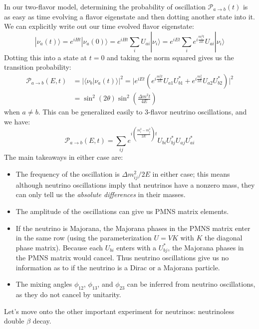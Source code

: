 \documentclass[11pt, oneside]{article}   	%
\theoremstyle{definition}
\numberwithin{equation}{subsection}		%
\begin{document}
In our two-flavor model, determining the probability of oscillation $\mathcal P_{a\rightarrow b}(t)$ is as easy as time evolving a flavor eigenstate and then 
dotting another state into it. We can explicitly write out our time evolved flavor eigenstate:
\begin{equation}
	|\nu_a(t)\rangle = e^{iHt} |\nu_a(0)\rangle = e^{i H t} \sum_i U_{a i}|\nu_i\rangle = e^{i Et} \sum_i e^{i\frac{m_i^2 t}{2 E}} U_{a i} |\nu_i\rangle
\end{equation}
Dotting this into a state at $t = 0$ and taking the norm squared gives us the transition probability:
\begin{align}
	\mathcal P_{a\rightarrow b}(E, t) &= |\langle \nu_b | \nu_a(t)\rangle |^2 = \bigg| e^{iEt} \left(e^{i \frac{m_1^2 t}{2 E}} U_{a1} U_{b1}^* + e^{i\frac{m_2^2}{2 E}} 
	U_{a2} U_{b2}^* \right)\bigg|^2 \\
	&= \sin^2(2\theta) \sin^2\left( \frac{\Delta m^2 t}{4 E} \right)
\end{align}
when $a\neq b$. This can be generalized easily to 3-flavor neutrino oscillations, and we have:
\begin{equation}
	\mathcal P_{a\rightarrow b}(E, t) = \sum_{ij} e^{i \left(\frac{m_i^2 - m_j^2}{2E}\right) t} U_{bi} U_{bj}^* U_{aj} U_{ai}^*
\end{equation}
The main takeaways in either case are:
\begin{itemize}
	\item The frequency of the oscillation is $\Delta m_{ij}^2 / 2E$ in either case; this means although neutrino oscillations imply that neutrinos have a nonzero 
	mass, they can only tell us the \textit{absolute differences} in their masses.
	\item The amplitude of the oscillations can give us PMNS matrix elements.
	\item If the neutrino is Majorana, the Majorana phases in the PMNS matrix enter in the same row (using the parameterization $U = VK$ with $K$ the diagonal 
	phase matrix). Because each $U_{bi}$ enters with a $U_{bj}^*$, the Majorana phases in the PMNS matrix would cancel. Thus neutrino oscillations 
	give us no information as to if the neutrino is a Dirac or a Majorana particle. 
	\item The mixing angles $\phi_{12}$, $\phi_{13}$, and $\phi_{23}$ can be inferred from neutrino oscillations, as they do not cancel by unitarity. 
\end{itemize}

Let's move onto the other important experiment for neutrinos: neutrinoless double $\beta$ decay. 
\end{document}
